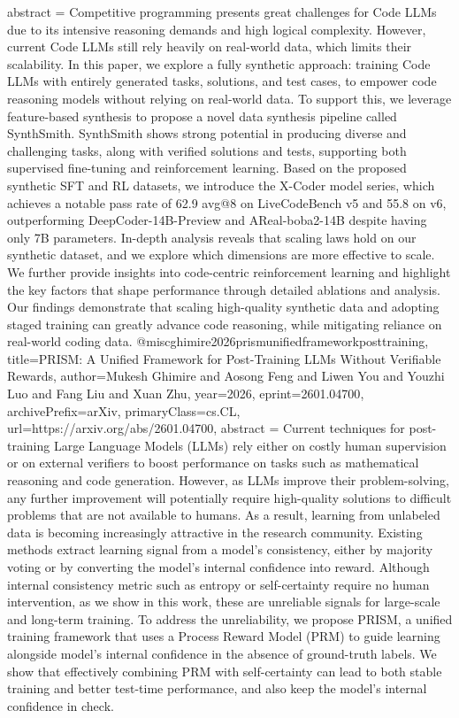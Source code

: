 {      abstract = {Competitive programming presents great challenges for Code LLMs due to its intensive reasoning demands and high logical complexity. However, current Code LLMs still rely heavily on real-world data, which limits their scalability. In this paper, we explore a fully synthetic approach: training Code LLMs with entirely generated tasks, solutions, and test cases, to empower code reasoning models without relying on real-world data. To support this, we leverage feature-based synthesis to propose a novel data synthesis pipeline called SynthSmith. SynthSmith shows strong potential in producing diverse and challenging tasks, along with verified solutions and tests, supporting both supervised fine-tuning and reinforcement learning. Based on the proposed synthetic SFT and RL datasets, we introduce the X-Coder model series, which achieves a notable pass rate of 62.9 avg@8 on LiveCodeBench v5 and 55.8 on v6, outperforming DeepCoder-14B-Preview and AReal-boba2-14B despite having only 7B parameters. In-depth analysis reveals that scaling laws hold on our synthetic dataset, and we explore which dimensions are more effective to scale. We further provide insights into code-centric reinforcement learning and highlight the key factors that shape performance through detailed ablations and analysis. Our findings demonstrate that scaling high-quality synthetic data and adopting staged training can greatly advance code reasoning, while mitigating reliance on real-world coding data.}
}@misc{ghimire2026prismunifiedframeworkposttraining,
      title={PRISM: A Unified Framework for Post-Training LLMs Without Verifiable Rewards}, 
      author={Mukesh Ghimire and Aosong Feng and Liwen You and Youzhi Luo and Fang Liu and Xuan Zhu},
      year={2026},
      eprint={2601.04700},
      archivePrefix={arXiv},
      primaryClass={cs.CL},
      url={https://arxiv.org/abs/2601.04700},
      abstract = {Current techniques for post-training Large Language Models (LLMs) rely either on costly human supervision or on external verifiers to boost performance on tasks such as mathematical reasoning and code generation. However, as LLMs improve their problem-solving, any further improvement will potentially require high-quality solutions to difficult problems that are not available to humans. As a result, learning from unlabeled data is becoming increasingly attractive in the research community. Existing methods extract learning signal from a model's consistency, either by majority voting or by converting the model's internal confidence into reward. Although internal consistency metric such as entropy or self-certainty require no human intervention, as we show in this work, these are unreliable signals for large-scale and long-term training. To address the unreliability, we propose PRISM, a unified training framework that uses a Process Reward Model (PRM) to guide learning alongside model's internal confidence in the absence of ground-truth labels. We show that effectively combining PRM with self-certainty can lead to both stable training and better test-time performance, and also keep the model's internal confidence in check.}
}
